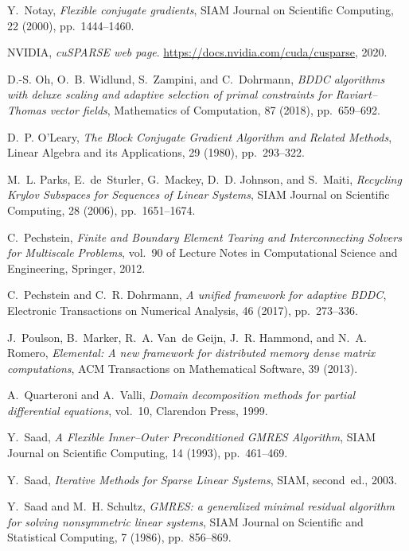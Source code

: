 \documentclass[3p,11pt]{elsarticle}
\begin{document}
\begin{thebibliography}{10}
{\sc Y.~Notay}, {\em Flexible conjugate gradients}, SIAM Journal on Scientific
  Computing, 22 (2000), pp.~1444--1460.

{\sc NVIDIA}, {\em {cuSPARSE} web page}.
\newblock \url{https://docs.nvidia.com/cuda/cusparse}, 2020.

{\sc D.-S. Oh, O.~B. Widlund, S.~Zampini, and C.~Dohrmann}, {\em {BDDC
  algorithms with deluxe scaling and adaptive selection of primal constraints
  for Raviart--Thomas vector fields}}, Mathematics of Computation, 87 (2018),
  pp.~659--692.

{\sc D.~P. O'Leary}, {\em {The Block Conjugate Gradient Algorithm and Related
  Methods}}, Linear Algebra and its Applications, 29 (1980), pp.~293--322.

{\sc M.~L. Parks, E.~de~Sturler, G.~Mackey, D.~D. Johnson, and S.~Maiti}, {\em
  {Recycling Krylov Subspaces for Sequences of Linear Systems}}, SIAM Journal
  on Scientific Computing, 28 (2006), pp.~1651--1674.

{\sc C.~Pechstein}, {\em {Finite and Boundary Element Tearing and
  Interconnecting Solvers for Multiscale Problems}}, vol.~90 of Lecture Notes
  in Computational Science and Engineering, Springer, 2012.

{\sc C.~Pechstein and C.~R. Dohrmann}, {\em {A unified framework for adaptive
  BDDC}}, Electronic Transactions on Numerical Analysis, 46 (2017),
  pp.~273--336.

{\sc J.~Poulson, B.~Marker, R.~A. Van~de Geijn, J.~R. Hammond, and N.~A.
  Romero}, {\em {Elemental: A new framework for distributed memory dense matrix
  computations}}, ACM Transactions on Mathematical Software, 39 (2013).

{\sc A.~Quarteroni and A.~Valli}, {\em Domain decomposition methods for partial
  differential equations}, vol.~10, Clarendon Press, 1999.

{\sc Y.~Saad}, {\em {A Flexible Inner--Outer Preconditioned GMRES Algorithm}},
  SIAM Journal on Scientific Computing, 14 (1993), pp.~461--469.

{\sc Y.~Saad}, {\em {Iterative Methods for Sparse Linear Systems}}, SIAM,
  second~ed., 2003.

{\sc Y.~Saad and M.~H. Schultz}, {\em {GMRES: a generalized minimal residual
  algorithm for solving nonsymmetric linear systems}}, SIAM Journal on
  Scientific and Statistical Computing, 7 (1986), pp.~856--869.


\end{thebibliography}
\end{document}
